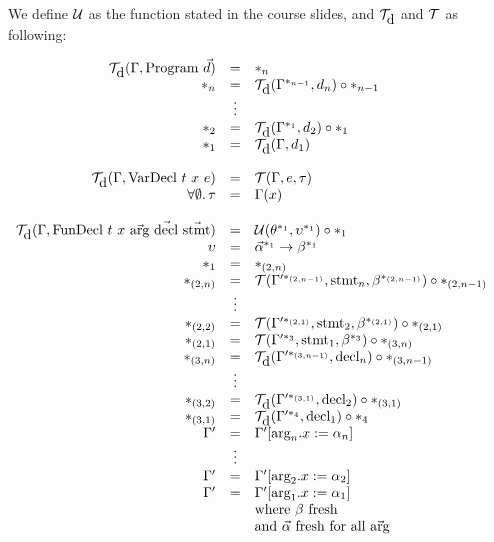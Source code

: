 \documentclass[11pt]{amsart}
\begin{document}
We define $\mathcal{U}$ as the function stated in the course slides, and $\mathcal{T}_{\mbox{d}}$ and $\mathcal{T}$ as following:

$\begin{array}{rcl}
	\T_{\mbox{d}}(\Gamma, \mbox{Program}~\vec{d}) & = & \s_n \\
	\sn{n} & = & \T_{\mbox{d}}(\Gamma^{\sn{n-1}}, d_n) \circ \sn{n-1} \\
	& \vdots & \\
	\sn{2} & = & \T_{\mbox{d}}(\Gamma^{\sn{1}}, d_2) \circ \sn{1} \\
	\sn{1} & = & \T_{\mbox{d}}(\Gamma, d_1) \\
	
	\\
	
	\T_{\mbox{d}}(\Gamma, \mbox{VarDecl}~t~x~e) & = & \T(\Gamma, e, \tau) \\
	\forall \emptyset . \, \tau	& = & \Gamma(x) \\

	\\

	\T_{\mbox{d}}(\Gamma, \mbox{FunDecl}~t~x~\vec{\mbox{arg}}~\vec{\mbox{decl}}~\vec{\mbox{stmt}}) & = & \U(\theta^{\sn{1}}, \upsilon^{\sn{1}}) \circ \sn{1} \\
	\upsilon	& = & \vec{\alpha}^{\sn{1}} \rightarrow \beta^{\sn{1}} \\
	\sn{1}		& = & \sn{(2,n)} \\
	\sn{(2,n)}	& = & \T(\Gamma'^{\sn{(2,n-1)}}, \mbox{stmt}_n, \beta^{\sn{(2,n-1)}}) \circ \sn{(2,n-1)} \\
	& \vdots & \\
	\sn{(2,2)}	& = & \T(\Gamma'^{\sn{(2,1)}}, \mbox{stmt}_2, \beta^{\sn{(2,1)}}) \circ \sn{(2,1)} \\
	\sn{(2,1)}	& = & \T(\Gamma'^{\sn{3}}, \mbox{stmt}_1, \beta^{\sn{3}}) \circ \sn{(3,n)} \\
	\sn{(3,n)}	& = & \T_{\mbox{d}}(\Gamma'^{\sn{(3,n-1)}}, \mbox{decl}_n) \circ \sn{(3,n-1)} \\
	& \vdots & \\
	\sn{(3,2)}	& = & \T_{\mbox{d}}(\Gamma'^{\sn{(3,1)}}, \mbox{decl}_2) \circ \sn{(3,1)} \\
	\sn{(3,1)}	& = & \T_{\mbox{d}}(\Gamma'^{\sn{4}}, \mbox{decl}_1) \circ \sn{4} \\
	\Gamma'		& = & \Gamma' [\mbox{arg}_n.x := \alpha_n] \\
	& \vdots & \\
	\Gamma'		& = & \Gamma' [\mbox{arg}_2.x := \alpha_2] \\
	\Gamma'		& = & \Gamma' [\mbox{arg}_1.x := \alpha_1] \\
	& & \mbox{where}~\beta~\mbox{fresh} \\
	& & \mbox{and}~\vec{\alpha}~\mbox{fresh for all~} \vec{\mbox{arg}} \\
\end{array}$
\end{document}
